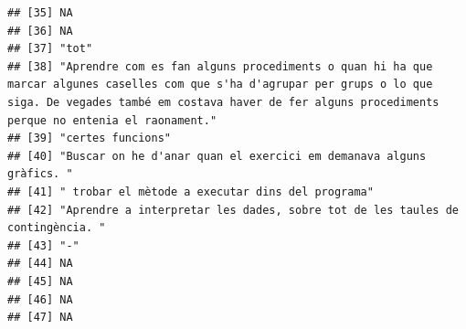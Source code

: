 \documentclass[
]{article}
\begin{document}
\begin{verbatim}
## [35] NA                                                                                                                                                                                                                             
## [36] NA                                                                                                                                                                                                                             
## [37] "tot"                                                                                                                                                                                                                          
## [38] "Aprendre com es fan alguns procediments o quan hi ha que marcar algunes caselles com que s'ha d'agrupar per grups o lo que siga. De vegades també em costava haver de fer alguns procediments perque no entenia el raonament."
## [39] "certes funcions"                                                                                                                                                                                                              
## [40] "Buscar on he d'anar quan el exercici em demanava alguns gràfics. "                                                                                                                                                            
## [41] " trobar el mètode a executar dins del programa"                                                                                                                                                                               
## [42] "Aprendre a interpretar les dades, sobre tot de les taules de contingència. "                                                                                                                                                  
## [43] "-"                                                                                                                                                                                                                            
## [44] NA                                                                                                                                                                                                                             
## [45] NA                                                                                                                                                                                                                             
## [46] NA                                                                                                                                                                                                                             
## [47] NA
\end{verbatim}
\end{document}
